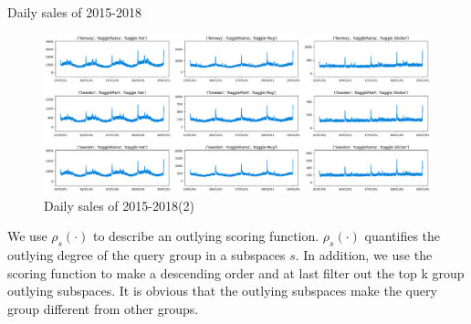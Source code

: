 \documentclass[
 size=14pt,
 paper=smartboard,  %
 mode=present, 		%
 display=slides, 	%
 style=tuliplab,  	%
 pauseslide,
 fleqn,leqno]{powerdot}
\begin{document}
\begin{slide}{Daily sales of 2015-2018}
\begin{figure}     
\centering     
\includegraphics[totalheight=2.8in]{04.eps}     
\caption{Daily sales of 2015-2018(2)}     
\end{figure}
\begin{note}
We use $\rho_s(\cdot)$ to describe an outlying scoring function.
$\rho_s(\cdot)$ quantifies the outlying degree of the query group in a subspaces $s$.
In addition,
we use the scoring function to make a descending order and at last
filter out the top k group outlying subspaces.
It is obvious that the outlying subspaces make the
query group different from other groups.
\end{note}

\end{slide}
\end{document}
